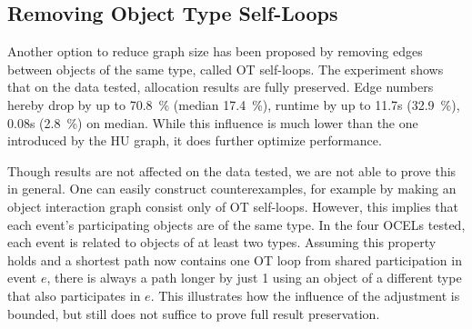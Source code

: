 
\subsection*{Removing Object Type Self-Loops}

Another option to reduce graph size has been proposed by removing edges between objects of the same type, called OT self-loops.
The experiment shows that on the data tested, allocation results are fully preserved.
Edge numbers hereby drop by up to \qty{70.8}{\percent} (median \qty{17.4}{\percent}), runtime by up to 11.7s (\qty{32.9}{\percent}), 0.08s (\qty{2.8}{\percent}) on median.
While this influence is much lower than the one introduced by the HU graph, it does further optimize performance.

Though results are not affected on the data tested, we are not able to prove this in general. One can easily construct counterexamples, for example by making an object interaction graph consist only of OT self-loops. However, this implies that each event's participating objects are of the same type.
In the four OCELs tested, each event is related to objects of at least two types. Assuming this property holds and a shortest path now contains one OT loop from shared participation in event $e$, there is always a path longer by just 1 using an object of a different type that also participates in $e$.
This illustrates how the influence of the adjustment is bounded, but still does not suffice to prove full result preservation.

  
